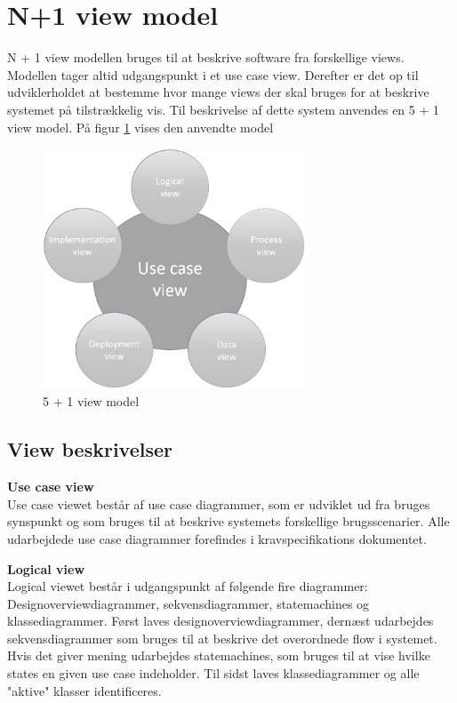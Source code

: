 \section{N+1 view model}

N + 1 view modellen bruges til at beskrive software fra forskellige views. Modellen tager altid udgangspunkt i et use case view. Derefter er det op til udviklerholdet at bestemme hvor mange views der skal bruges for at beskrive systemet på tilstrækkelig vis. Til beskrivelse af dette system anvendes en 5 + 1 view model. På figur \ref{fig:5 + 1 view model} vises den anvendte model


\vspace{-5pt}
\begin{figure}[H]
	\centering
	\includegraphics[width=0.7\textwidth]{Billeder/n+1}
	\vspace{0cm}
	\caption{5 + 1 view model}
	\label{fig:5 + 1 view model}
\end{figure}


\newpage

\subsection{View beskrivelser}

\textbf{Use case view}\\
Use case viewet består af use case diagrammer, som er udviklet ud fra bruges synspunkt og som bruges til at beskrive systemets forskellige brugsscenarier. Alle udarbejdede use case diagrammer forefindes i kravspecifikations dokumentet.

\textbf{Logical view}\\
Logical viewet består i udgangspunkt af følgende fire diagrammer: Designoverviewdiagrammer, sekvensdiagrammer, statemachines og klassediagrammer. Først laves designoverviewdiagrammer, dernæst udarbejdes sekvensdiagrammer som bruges til at beskrive det overordnede flow i systemet. Hvis det giver mening udarbejdes statemachines, som bruges til at vise hvilke states en given use case indeholder. Til sidst laves klassediagrammer og alle "aktive" klasser identificeres. 

